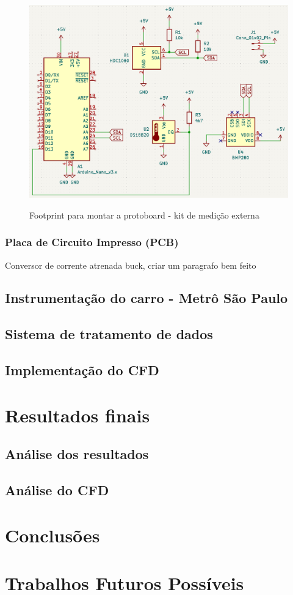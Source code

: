 \documentclass[acronym,symbols]{fei}
\begin{document}
\begin{figure}[!htb]
\centering
    \caption{Footprint para montar a protoboard - kit de medição externa}
    \includegraphics[width=1\linewidth]{Imagens/Footprint protoboard Externo.png}
    \label{fig:footprintprotoboardext}
\end{figure}

\subsection{Placa de Circuito Impresso (PCB) } \label{PCB}

Conversor de corrente atrenada buck, criar um paragrafo bem feito

\section{Instrumentação do carro - Metrô São Paulo}

\section{Sistema de tratamento de dados}

\section{Implementação do CFD}

\chapter{Resultados finais}

\section{Análise dos resultados}

\section{Análise do CFD}

\chapter{Conclusões}

\chapter{Trabalhos Futuros Possíveis}

\printbibliography
\end{document}

